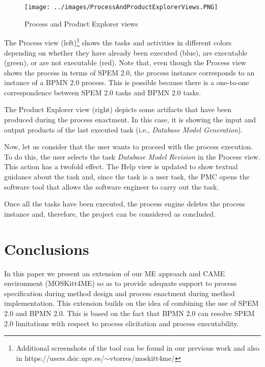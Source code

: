 \documentclass[runningheads,a4paper]{llncs}
\begin{document}
\begin{figure}
\centering
\texttt{[image: ../images/ProcessAndProductExplorerViews.PNG]}
\caption{Process and Product Explorer views}
\label{ProcessProductView}
\end{figure}

The Process view (left)\footnote{Additional screenshots of the tool
can be found in our previous work \cite{Cervera10,Cervera11,Cervera10b} and also
in https://users.dsic.upv.es/$\sim$vtorres/moskitt4me/} shows the
tasks and activities in different colors depending on whether they have already
been executed (blue), are executable (green), or are not executable (red). Note
that, even though the Process view shows the process in terms of SPEM 2.0, the
process instance corresponds to an instance of a BPMN 2.0 process. This is
possible because there is a one-to-one correspondence between SPEM 2.0 tasks and
BPMN 2.0 tasks.

The Product Explorer view (right) depicts some artifacts that have been
produced during the process enactment. In this case, it is showing the input and
output products of the last executed task (i.e., \textit{Database Model
Generation}).

Now, let us consider that the user wants to proceed with the process execution.
To do this, the user selects the task \textit{Database Model Revision} in
the Process view. This action has a twofold effect. The Help
view is updated to show textual guidance about the task and, since the task is a
user task, the PMC opens the software tool that allows the software
engineer to carry out the task.

Once all the tasks have been executed, the process engine deletes the process
instance and, therefore, the project can be considered as concluded.

\section{Conclusions}
\label{SectionConclusions}

In this paper we present an extension of our ME approach and CAME environment
(MOSKitt4ME) \cite{Cervera10,Cervera11} so as to provide adequate support to
process specification during method design and process enactment during method
implementation. This extension builds on the idea of combining the use of SPEM
2.0 and BPMN 2.0. This is based on the fact that BPMN 2.0 can resolve SPEM 2.0
limitations with respect to process elicitation and process executability.
\end{document}
